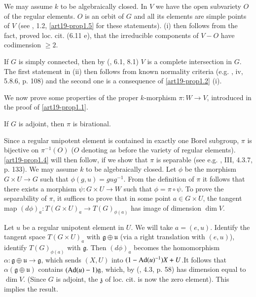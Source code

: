 We may assume $k$ to be algebraically closed. In $V$ we have the open subvariety $O$ of the regular elements. $O$ is an orbit of $G$ and all its elements are simple points of $V$ (see \cite{art19-key15}, 1.2, \ref{art19-prop1.5} for these statements). (i) then follows from the fact, proved loc. cit. (6.11 e), that the irreducible components of $V-O$ have codimension $\geq 2$.

If $G$ is simply connected, then by (\cite{art19-key15}, 6.1, 8.1) $V$ is a complete intersection in $G$. The first statement in (ii) then follows from known normality criteria (e.g. \cite{art19-key7}, iv, 5.8.6, p. 108) and the second one is a consequence of \ref{art19-prop1.2} (i).

We now prove some properties of the proper $k$-morphism $\pi:W\to V$, introduced in the proof of \ref{art19-prop1.1}.

\begin{proposition}\label{art19-prop1.4}
If $G$ is adjoint, then $\pi$ is birational.
\end{proposition}

Since a regular unipotent element is contained in exactly one Borel subgroup, $\pi$ is bijective on $\pi^{-1}(O)$ ($O$ denoting as before the variety of regular elements). \ref{art19-prop1.4} will then follow, if we show that $\pi$ is separable (see e.g. \cite{art19-key7}, III, 4.3.7, p. 133). We may assume $k$ to be algebraically closed. Let $\phi$ be the morphism $G\times U\to G$ such that $\phi(g,u)=gug^{-1}$. From the definition of $\pi$ it follows that there exists a morphism $\psi : G\times U\to W$ such that $\phi=\pi\circ\psi$. To prove the separability of $\pi$, it suffices to prove that in some point $a\in G\times U$, the tangent map $(d\phi)_{a}:T(G\times U)_{a}\to T(G)_{\phi(a)}$ has image of dimension $\dim V$.

Let $u$ be a regular unipotent element in $U$. We will take $a=(e,u)$. Identify the tangent space $T(G\times U)_{a}$ with $\mathfrak{g}\oplus \mathfrak{u}$ (via a right translation with $(e,u)$), identify $T(G)_{\phi(a)}$ with $\mathfrak{g}$. Then $(d\phi)_{a}$ becomes the homomorphism $\alpha :\mathfrak{g}\oplus \mathfrak{u}\to \mathfrak{g}$, which sends $(X,U)$ into $(1-\operatorname{\mathrm{Ad}}(u)^{-1})X+U$.\pageoriginale It follows that $\alpha(\mathfrak{g}\oplus \mathfrak{u})$ contains $(\operatorname{\mathrm{Ad}} (u)-1)\mathfrak{g}$, which, by (\cite{art19-key15}, 4.3, p. 58) has dimension equal to $\dim V$. (Since $G$ is adjoint, the $\mathfrak{z}$ of loc. cit. is now the zero element). This implies the result.

